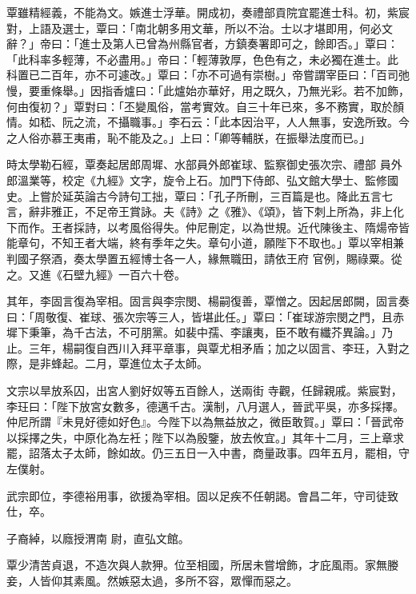 \begin{pinyinscope}
 覃雖精經義，不能為文。嫉進士浮華。開成初，奏禮部貢院宜罷進士科。初，紫宸對，上語及選士，覃曰：「南北朝多用文華，所以不治。士以才堪即用，何必文辭？」帝曰：「進士及第人已曾為州縣官者，方鎮奏署即可之，餘即否。」覃曰：「此科率多輕薄，不必盡用。」帝曰：「輕薄敦厚，色色有之，未必獨在進士。此
 科置已二百年，亦不可遽改。」覃曰：「亦不可過有崇樹。」帝嘗謂宰臣曰：「百司弛慢，要重條舉。」因指香爐曰：「此爐始亦華好，用之既久，乃無光彩。若不加飾，何由復初？」覃對曰：「丕變風俗，當考實效。自三十年已來，多不務實，取於顏情。如嵇、阮之流，不攝職事。」李石云：「此本因治平，人人無事，安逸所致。今之人俗亦慕王夷甫，恥不能及之。」上曰：「卿等輔朕，在振舉法度而已。」



 時太學勒石經，覃奏起居郎周墀、水部員外郎崔球、監察御史張次宗、禮部
 員外郎溫業等，校定《九經》文字，旋令上石。加門下侍郎、弘文館大學士、監修國史。上嘗於延英論古今詩句工拙，覃曰：「孔子所刪，三百篇是也。降此五言七言，辭非雅正，不足帝王賞詠。夫《詩》之《雅》、《頌》，皆下刺上所為，非上化下而作。王者採詩，以考風俗得失。仲尼刪定，以為世規。近代陳後主、隋煬帝皆能章句，不知王者大端，終有季年之失。章句小道，願陛下不取也。」覃以宰相兼判國子祭酒，奏太學置五經博士各一人，緣無職田，請依王府
 官例，賜祿粟。從之。又進《石壁九經》一百六十卷。



 其年，李固言復為宰相。固言與李宗閔、楊嗣復善，覃憎之。因起居郎闕，固言奏曰：「周敬復、崔球、張次宗等三人，皆堪此任。」覃曰：「崔球游宗閔之門，且赤墀下秉筆，為千古法，不可朋黨。如裴中孺、李讓夷，臣不敢有纖芥異論。」乃止。三年，楊嗣復自西川入拜平章事，與覃尤相矛盾；加之以固言、李玨，入對之際，是非蜂起。二月，覃進位太子太師。



 文宗以旱放系囚，出宮人劉好奴等五百餘人，送兩街
 寺觀，任歸親戚。紫宸對，李玨曰：「陛下放宮女數多，德邁千古。漢制，八月選人，晉武平吳，亦多採擇。仲尼所謂『未見好德如好色』。今陛下以為無益放之，微臣敢賀。」覃曰：「晉武帝以採擇之失，中原化為左衽；陛下以為殷鑒，放去攸宜。」其年十二月，三上章求罷，詔落太子太師，餘如故。仍三五日一入中書，商量政事。四年五月，罷相，守左僕射。



 武宗即位，李德裕用事，欲援為宰相。固以足疾不任朝謁。會昌二年，守司徒致仕，卒。



 子裔綽，以廕授渭南
 尉，直弘文館。



 覃少清苦貞退，不造次與人款狎。位至相國，所居未嘗增飾，才庇風雨。家無媵妾，人皆仰其素風。然嫉惡太過，多所不容，眾憚而惡之。




\end{pinyinscope}
